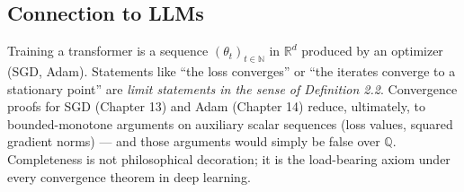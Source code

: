 \subsection*{Connection to LLMs}

Training a transformer is a sequence $(\theta_t)_{t \in \mathbb{N}}$ in $\mathbb{R}^d$ produced by an optimizer (SGD, Adam). Statements like ``the loss converges'' or ``the iterates converge to a stationary point'' are \emph{limit statements in the sense of Definition 2.2}. Convergence proofs for SGD (Chapter 13) and Adam (Chapter 14) reduce, ultimately, to bounded-monotone arguments on auxiliary scalar sequences (loss values, squared gradient norms) --- and those arguments would simply be false over $\mathbb{Q}$. Completeness is not philosophical decoration; it is the load-bearing axiom under every convergence theorem in deep learning.
